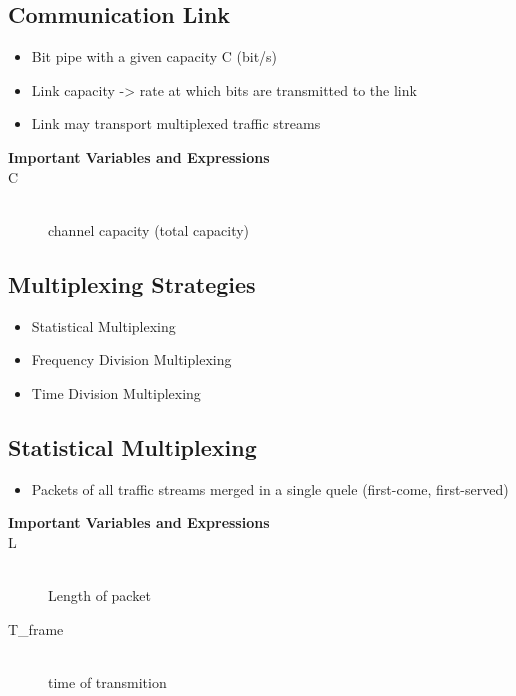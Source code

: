 \documentclass[../resumosRCOM.tex]{subfiles}
\begin{document}
 
\subsection{Communication Link}

\begin{itemize}
    \item Bit pipe with a given capacity C (bit/s)
    \item Link capacity -> rate at which bits are transmitted to the link
    \item Link may transport multiplexed traffic streams
\end{itemize}

\begin{description}
    \item [\textbf{Important Variables and Expressions}]
    \item[C] \hfill \\ channel capacity (total capacity)  
\end{description}

\subsection{Multiplexing Strategies}

\begin{itemize}
    \item Statistical Multiplexing
    \item Frequency Division Multiplexing
    \item Time Division Multiplexing
\end{itemize}

\subsection{Statistical Multiplexing}

\begin{itemize}
    \item Packets of all traffic streams merged in a single quele (first-come, first-served)
\end{itemize}

\begin{description}
    \item [\textbf{Important Variables and Expressions}]
    \item[L] \hfill \\ Length of packet
    \item[T_{frame}] \hfill \\ time of transmition
\end{description}
\end{document}
